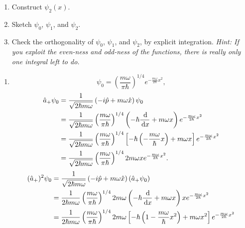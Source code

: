 \documentclass[en, oneside]{vivi}
\begin{document}
\begin{prob}
    \begin{enumerate}[label=(\alph*)]
        \item Construct $\psi_2(x)$.
        \item Sketch $\psi_0$, $\psi_1$, and $\psi_2$.
        \item Check the orthogonality of $\psi_0$, $\psi_1$, and $\psi_2$, by explicit integration. 
        \textit{Hint: If you exploit the even-ness and odd-ness of the functions, there is really only one integral left to do.}
    \end{enumerate}
\end{prob}

\begin{sol}
    \begin{enumerate}[label=(\alph*)]
        \item \begin{equation*}
            \psi_0 = \left( \frac{m \omega}{\pi \hbar} \right)^{1/4} e^{-\frac{m \omega}{2\hbar}x^2},
        \end{equation*}
        \begin{align*}
            \hat a_+ \psi_0 &= \frac{1}{\sqrt{2\hbar m \omega}} \left( -i \hat p + m \omega \hat x \right) \psi_0\\
            &= \frac{1}{\sqrt{2\hbar m \omega}} \left( \frac{m \omega}{\pi \hbar} \right)^{1/4} \left( - \hbar \frac{\dif}{\dif x} + m \omega x \right) e^{-\frac{m \omega}{2\hbar}x^2}\\
            &= \frac{1}{\sqrt{2\hbar m \omega}} \left( \frac{m \omega}{\pi \hbar} \right)^{1/4} \left[ - \hbar \left( -\frac{m \omega}{\hbar} x \right) + m \omega x \right] e^{-\frac{m \omega}{2\hbar}x^2}\\
            &= \frac{1}{\sqrt{2\hbar m \omega}} \left( \frac{m \omega}{\pi \hbar} \right)^{1/4} 2 m \omega x e^{-\frac{m \omega}{2\hbar}x^2}.
        \end{align*}
        \begin{align*}
            (\hat a_+)^2 \psi_0 &= \frac{1}{\sqrt{2\hbar m \omega}} \left( -i \hat p + m \omega \hat x \right) \left( \hat a_+ \psi_0 \right)\\
            &= \frac{1}{2 \hbar m \omega} \left( \frac{m \omega}{\pi \hbar} \right)^{1/4} 2 m \omega \left( - \hbar \frac{\dif}{\dif x} + m \omega x \right) x e^{-\frac{m \omega}{2\hbar}x^2}\\
            &= \frac{1}{2 \hbar m \omega} \left( \frac{m \omega}{\pi \hbar} \right)^{1/4} 2 m \omega \left[ - \hbar \left( 1 -\frac{m \omega}{\hbar} x^2 \right) + m \omega x^2 \right] e^{-\frac{m \omega}{2\hbar}x^2}\\

\end{align*}
\end{enumerate}
\end{sol}
\end{document}
